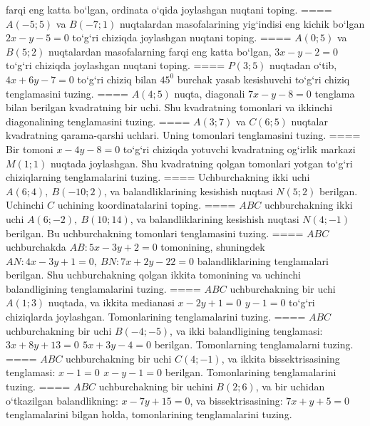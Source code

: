 farqi eng katta bo‘lgan, ordinata o‘qida joylashgan nuqtani toping.
====
\(A (-5;5) \) va \(B (-7;1) \) nuqtalardan
masofalarining yig‘indisi eng kichik bo‘lgan \(2x - y - 5 = 0\) to‘g‘ri chiziqda
joylashgan nuqtani toping.
====
\(A (0;5) \) va \(B (5;2) \) nuqtalardan masofalarning
farqi eng katta bo‘lgan, \(3x - y - 2 = 0\) to‘g‘ri chiziqda joylashgan
nuqtani toping.
====
\(P (3;5) \) nuqtadan o‘tib, \(4x + 6y - 7 = 0\) to‘g‘ri chiziq
bilan \(45^{0}\) burchak yasab kesishuvchi to‘g‘ri chiziq tenglamasini tuzing.
====
\(A (4;5) \) nuqta, diagonali \(7x - y - 8 = 0\) tenglama
bilan berilgan kvadratning bir uchi. Shu kvadratning tomonlari va
ikkinchi diagonalining tenglamasini tuzing.
====
\(A (3;7) \) va \(C (6; 5) \) nuqtalar kvadratning
qarama-qarshi uchlari. Uning tomonlari tenglamasini tuzing.
====
Bir tomoni \(x-4y - 8 = 0\) to‘g‘ri chiziqda yotuvchi
kvadratning og‘irlik markazi \(M (1;1) \) nuqtada joylashgan. Shu kvadratning
qolgan tomonlari yotgan to‘g‘ri chiziqlarning tenglamalarini tuzing.
====
Uchburchakning ikki uchi \(A (6;4),\ B (- 10;2) \), va
balandliklarining kesishish nuqtasi \(N (5;2) \) berilgan. Uchinchi $C$
uchining koordinatalarini toping.
====
$ABC$ uchburchakning ikki uchi
\(A (6; - 2),\ B (10;14) \), va balandliklarining kesishish nuqtasi
\(N (4; - 1) \) berilgan. Bu uchburchakning tomonlari tenglamasini tuzing.
====
$ABC$ uchburchakda \(AB:5x-3y+2=0\)
tomonining, shuningdek \(AN:4x - 3y + 1 = 0,\ BN:7x + 2y - 22 = 0\)
balandliklarining tenglamalari berilgan. Shu uchburchakning qolgan ikkita
tomonining va uchinchi balandligining tenglamalarini tuzing.
====
$ABC$ uchburchakning bir uchi \(A (1;3) \) nuqtada,
va ikkita medianasi \(x - 2y + 1 = 0\,\ y - 1 = 0\) to‘g‘ri chiziqlarda
joylashgan. Tomonlarining tenglamalarini tuzing.
====
$ABC$ uchburchakning bir uchi \(B (- 4; - 5) \),
va ikki balandligining tenglamasi:
\(3x + 8y + 13 = 0\,\ 5x + 3y - 4 = 0\) berilgan. Tomonlarning
tenglamalarni tuzing.
====
$ABC$ uchburchakning bir uchi \(C (4; - 1) \), va
ikkita bissektrisasining tenglamasi: \(x - 1 = 0\,\ x - y - 1 = 0\)
berilgan. Tomonlarining tenglamalarini tuzing.
====
$ABC$ uchburchakning bir uchini \(B (2;6) \), va
bir uchidan o‘tkazilgan balandlikning: \(x - 7y + 15 = 0\), va
bissektrisasining: \(7x + y + 5 = 0\) tenglamalarini bilgan holda,
tomonlarining tenglamalarini tuzing.